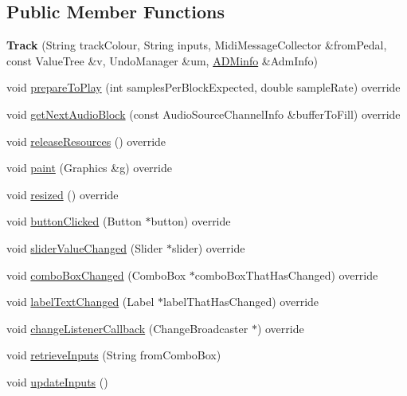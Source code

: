 \subsection*{Public Member Functions}
\begin{DoxyCompactItemize}
\item 
\mbox{\label{class_track_af7c1002b99aa7ffb69775b0409cdf1dc}} 
{\bfseries Track} (String track\+Colour, String inputs, Midi\+Message\+Collector \&from\+Pedal, const Value\+Tree \&v, Undo\+Manager \&um, \mbox{\hyperlink{class_a_d_minfo}{A\+D\+Minfo}} \&Adm\+Info)
\item 
void \mbox{\hyperlink{class_track_a0c093e11c72e34eb8696c351ca020fb9}{prepare\+To\+Play}} (int samples\+Per\+Block\+Expected, double sample\+Rate) override
\item 
void \mbox{\hyperlink{class_track_ae1b8b567bc88db45ba20f990ce872c96}{get\+Next\+Audio\+Block}} (const Audio\+Source\+Channel\+Info \&buffer\+To\+Fill) override
\item 
void \mbox{\hyperlink{class_track_a7d0d27ceff045cfe777c94ca8116c372}{release\+Resources}} () override
\item 
void \mbox{\hyperlink{class_track_a8ad88c68d4c7608f89f84ece5e06881e}{paint}} (Graphics \&g) override
\item 
void \mbox{\hyperlink{class_track_a64ce8e4f98a9a9b84d42bd77d869366b}{resized}} () override
\item 
void \mbox{\hyperlink{class_track_acc9d4ec238e6cbfa01cb1b656dd842d9}{button\+Clicked}} (Button $\ast$button) override
\item 
void \mbox{\hyperlink{class_track_aa79209142c2fc3321441f2eb04f17ba2}{slider\+Value\+Changed}} (Slider $\ast$slider) override
\item 
void \mbox{\hyperlink{class_track_ac9870b46d656c0390cbec57731d96d9e}{combo\+Box\+Changed}} (Combo\+Box $\ast$combo\+Box\+That\+Has\+Changed) override
\item 
void \mbox{\hyperlink{class_track_a7dd5facb0d03d74f578b86b0280f33da}{label\+Text\+Changed}} (Label $\ast$label\+That\+Has\+Changed) override
\item 
void \mbox{\hyperlink{class_track_a84b1934243994bd64120e4cc79f8a054}{change\+Listener\+Callback}} (Change\+Broadcaster $\ast$) override
\item 
void \mbox{\hyperlink{class_track_ac20c0787d81235fde26e08c133998450}{retrieve\+Inputs}} (String from\+Combo\+Box)
\item 
void \mbox{\hyperlink{class_track_abf06d5a33a170a0c903f765a01fb6f23}{update\+Inputs}} ()

\end{DoxyCompactItemize}
